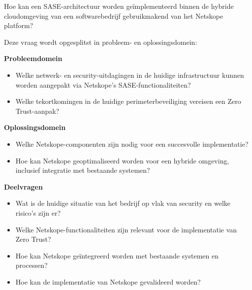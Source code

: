 Hoe kan een SASE-architectuur worden geïmplementeerd binnen de hybride cloudomgeving van een softwarebedrijf gebruikmakend van het Netskope platform?

\vspace{2ex}

Deze vraag wordt opgesplitst in probleem- en oplossingsdomein:

\textbf{Probleemdomein}
\begin{itemize}
  \item Welke netwerk- en security-uitdagingen in de huidige infrastructuur kunnen worden aangepakt via Netskope's SASE-functionaliteiten?
  \item Welke tekortkomingen in de huidige perimeterbeveiliging vereisen een Zero Trust-aanpak?
\end{itemize}

\vspace{2ex}

\textbf{Oplossingsdomein}
\begin{itemize}
  \item Welke Netskope-componenten zijn nodig voor een succesvolle implementatie?
  \item Hoe kan Netskope geoptimaliseerd worden voor een hybride omgeving, inclusief integratie met bestaande systemen?
\end{itemize}

\vspace{2ex}

\textbf{Deelvragen}
\begin{itemize}
  \item Wat is de huidige situatie van het bedrijf op vlak van security en welke risico’s zijn er?
  \item Welke Netskope-functionaliteiten zijn relevant voor de implementatie van Zero Trust?
  \item Hoe kan Netskope geïntegreerd worden met bestaande systemen en processen?
  \item Hoe kan de implementatie van Netskope gevalideerd worden?
\end{itemize}

\section{}%
\label{sec:onderzoeksdoelstelling}


